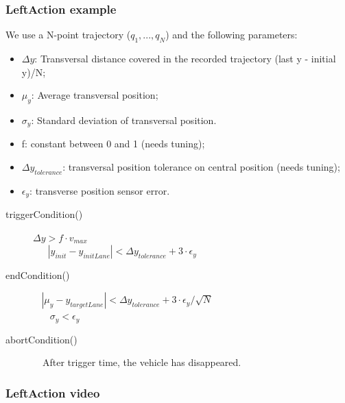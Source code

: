 \documentclass{beamer}
\begin{document}
\begin{frame}
\frametitle{LeftAction example}

We use a N-point trajectory ($q_1, ..., q_N$) and the following parameters:
\begin{itemize}
\item $\Delta y$: Transversal distance covered in the recorded trajectory (last y - initial y)/N;
\item $\mu_y$: Average transversal position;
\item $\sigma_y$: Standard deviation of transversal position.
\item f: constant between 0 and 1 (needs tuning);
\item $\Delta y_{tolerance}$: transversal position tolerance on central position (needs tuning);
\item $\epsilon_y$: transverse position sensor error. 
\end{itemize}

\bigskip

\begin{description}
\item[triggerCondition()] 
$ \Delta y > f\cdot v_{max}$ \\
 $\ \ \ \ \ \ \ |y_{init} - y_{initLane}| < \Delta y_{tolerance} + 3\cdot\epsilon_y$

\item[endCondition()] 
$\ \ \ \ |\mu_y - y_{targetLane}| < \Delta y_{tolerance} + 3\cdot\epsilon_y/\sqrt{N}$ \\
$\ \ \ \ \ \ \ \ \sigma_y < \epsilon_y$

\item[abortCondition()] \ \ After trigger time, the vehicle has disappeared.
 
\end{description}
\end{frame}

\begin{frame}
\frametitle{LeftAction video}


\end{frame}
\end{document}
